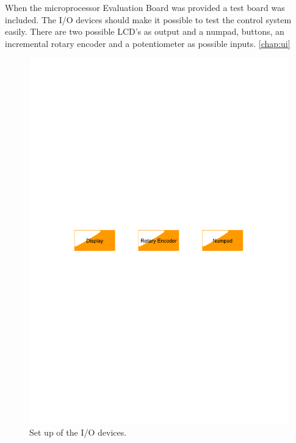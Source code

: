 When the microprocessor Evaluation Board was provided a test board was included. The I/O devices should make it possible to test the control system easily. There are two possible LCD's as output and a numpad, buttons, an incremental rotary encoder and a potentiometer as possible inputs. \ref{chap:ui}
\begin{figure}[htb]
	\centering
	\includegraphics[scale=0.5,clip,trim=00 400 00 400]{graphics/iodevices} %
	\caption{Set up of the I/O devices.}
	\label{fig:iodevices}			%
\end{figure}


